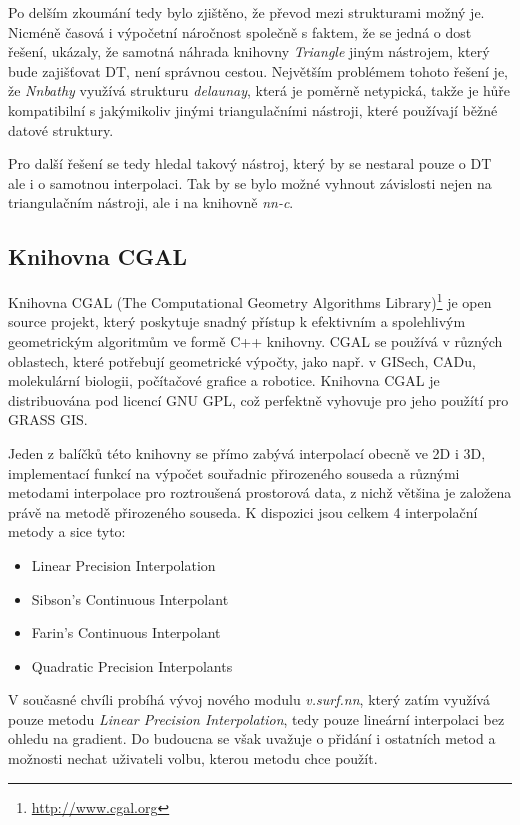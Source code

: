 \documentclass[12pt,a4paper]{article}
\begin{document}
{Po delším zkoumání tedy bylo zjištěno, že převod mezi strukturami
možný je. Nicméně časová i výpočetní náročnost společně s faktem, že
se jedná o dost  řešení, ukázaly, že samotná náhrada
knihovny \emph{Triangle} jiným nástrojem, který bude zajišťovat DT,
není správnou cestou. Největším problémem tohoto řešení je, že
\emph{Nnbathy} využívá strukturu \emph{delaunay}, která je poměrně
netypická, takže je hůře kompatibilní s jakýmikoliv jinými
triangulačními nástroji, které používají běžné datové struktury.

Pro další řešení se tedy hledal takový nástroj, který by se nestaral
pouze o DT ale i o samotnou interpolaci. Tak by se bylo možné vyhnout
závislosti nejen na triangulačním nástroji, ale i na knihovně
\emph{nn-c}.

\newpage
\subsection{Knihovna CGAL}


Knihovna CGAL (The Computational Geometry Algorithms
Library)\footnote{\url{http://www.cgal.org}} je open source projekt, který
poskytuje snadný přístup k efektivním a spolehlivým geometrickým
algoritmům ve formě C++ knihovny. CGAL se používá v různých oblastech,
které potřebují geometrické výpočty, jako např. v GISech, CADu,
molekulární biologii, počítačové grafice a robotice. Knihovna CGAL je
distribuována pod licencí GNU GPL, což perfektně vyhovuje pro jeho
použítí pro GRASS GIS.

Jeden z balíčků této knihovny se přímo zabývá interpolací obecně ve 2D
i 3D, implementací funkcí na výpočet souřadnic přirozeného souseda a
různými metodami interpolace pro roztroušená prostorová data, z nichž
většina je založena právě na metodě přirozeného souseda. K dispozici
jsou celkem 4 interpolační metody a sice tyto:
\begin{itemize}
\item Linear Precision Interpolation
\item Sibson's Continuous Interpolant
\item Farin's Continuous Interpolant
\item Quadratic Precision Interpolants
\end{itemize}

V současné chvíli probíhá vývoj nového modulu \emph{v.surf.nn}, který
zatím využívá pouze metodu \emph{Linear Precision Interpolation}, tedy
pouze lineární interpolaci bez ohledu na gradient. Do budoucna se však
uvažuje o přidání i ostatních metod a možnosti nechat uživateli volbu,
kterou metodu chce použít.

}
\end{document}
